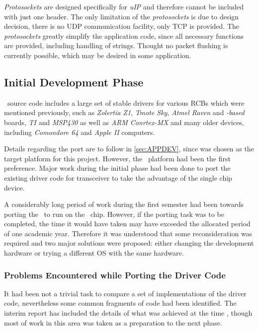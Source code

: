   \emph{Protosockets} are designed specifically for \emph{uIP} and therefore 
 cannot be included with just one header. The only limitation of the
 \emph{protosockets} is due to design decision, there is no UDP communication
 facility, only TCP is provided. The \emph{protosockets} greatly simplify the
 application code, since all necessary functions are provided, including
 handling of strings. Thought no packet flushing is currently possible, which
 may be desired in some application.

\subsection{Initial Development Phase}

  \Contiki\ source code includes a large set of stable drivers for various
 RCBs which were mentioned previously, such as \emph{Zolertia Z1}, \emph{Tmote
 Sky}, \emph{Atmel Raven} and \emph{-based} boards, \emph{TI}
  and \emph{MSP430} as well as \emph{ARM Conrtex-MX} and many
 older devices, including \emph{Comondore 64} and \emph{Apple II} computers.

 Details regarding the  port \cite{links:contiki:port:mc1322x}
 are to follow in \ref{sec:APPDEV}, since  was chosen as the
 target platform for this project. However, the \RFA\ platform had been the
 first preference. Major work during the initial phase had been done to
 port the existing driver code for  transceiver to take the
 advantage of the single chip device. %


  A considerably long period of work during the first semester had been
 towards porting the \ContikiOS\ to run on the \RFA\ chip. However, if
 the porting task was to be completed, the time it would have taken may
 have exceeded the allocated period of one academic year. Therefore it
 was understood that some reconsideration was required and two major
 solutions were proposed: either changing the development hardware or
 trying a different OS with the same hardware.

\subsubsection{Problems Encountered while Porting the Driver Code}

  It had been not a trivial task to compare a set of implementations
 of the driver code, nevertheless some common fragments of code had
 been identified. The interim report has included the details of what
 was achieved at the time \cite{wmi:irep}, though most of work in this
 area was taken as a preparation to the next phase.

